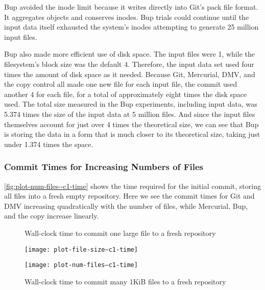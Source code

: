 Bup avoided the \gls{inode} limit because it writes directly into Git's pack file format.
It aggregates objects and conserves inodes.
Bup trials could continue until the input data itself exhausted the system's \glspl{inode} attempting to generate \num{25} million input files.

Bup also made more efficient use of disk space.
The input files were \SI{1}{\kib}, while the filesystem's block size was the default \SI{4}{\kib}.
Therefore, the input data set used four times the amount of disk space as it needed.
Because Git, Mercurial, DMV, and the copy control all made one new file for each input file, the commit used another \SI{4}{\kib} for each file, for a total of approximately eight times the disk space used.
The total size measured in the Bup experiments, including input data, was \num{5.374} times the size of the input data at \num{5} million files.
And since the input files themselves account for just over \num{4} times the theoretical size, we can see that Bup is storing the data in a form that is much closer to its theoretical size, taking just under \num{1.374} times the space.

%


\subsubsection{Commit Times for Increasing Numbers of Files}

\autoref{fig:plot-num-files--c1-time} shows the time required for the initial \gls{commit}, storing all files into a fresh empty \gls{repository}.
Here we see the commit times for Git and DMV increasing quadratically with the number of files, while Mercurial, Bup, and the copy increase linearly.

\begin{figure}
    \centering
    \begin{minipage}{.5\textwidth}

        \caption{Wall-clock time to commit one large file to a fresh repository}
        \label{fig:plot-file-size--c1-time}
        \centering
        \texttt{[image: plot-file-size--c1-time]}

    \end{minipage}%
    \begin{minipage}{.5\textwidth}

        \caption{Wall-clock time to commit many 1KiB files to a fresh repository}
        \label{fig:plot-num-files--c1-time}
        \centering
        \texttt{[image: plot-num-files--c1-time]}

    \end{minipage}
\end{figure}
